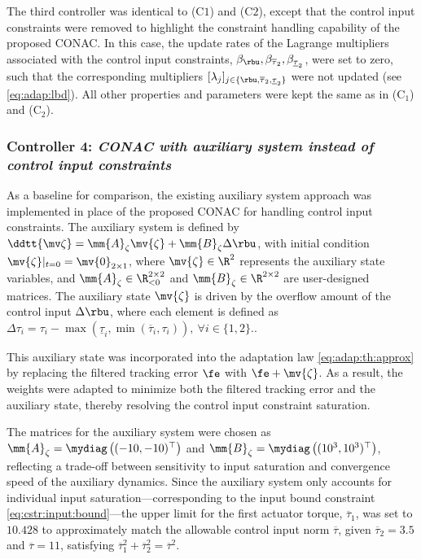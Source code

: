 \documentclass[journal]{IEEEtran}
\begin{document}
The third controller was identical to (C$1$) and (C$2$), except that the control input constraints were removed to highlight the constraint handling capability of the proposed CONAC.
In this case, the update rates of the Lagrange multipliers associated with the control input constraints, \ie $\beta_{\rbu},\beta_{\overline{\tau}_2},\beta_{\underline{\tau}_2}$, were set to zero, such that the corresponding multipliers $[\lambda_j]_{j\in\{\rbu,\overline{\tau}_2,\underline{\tau}_2\}}$ were not updated (see \eqref{eq:adap:lbd}).
All other properties and parameters were kept the same as in (C$_1$) and (C$_2$).

\subsubsection*{Controller 4:  \textit{CONAC with auxiliary system instead of control input constraints}}

As a baseline for comparison, the existing auxiliary system approach \cite{Esfandiari:2014aa, Karason:1994aa, Esfandiari:2015aa} was implemented in place of the proposed CONAC for handling control input constraints.
The auxiliary system is defined by $\ddtt{\mv\zeta} = \mm{A}_\zeta \mv{\zeta} + \mm{B}_\zeta \Delta\rbu$, with initial condition $\mv{\zeta}\vert_{t=0} = \mv{0}_{2\times1}$, where $\mv{\zeta}\in\R^2$ represents the auxiliary state variables, and $\mm{A}_\zeta\in\R_{<0}^{2\times 2}$ and $\mm{B}_\zeta\in\R^{2\times 2}$ are user-designed matrices.
The auxiliary state $\mv{\zeta}$ is driven by the overflow amount of the control input $\Delta\rbu$, where each element is defined as $\Delta\tau_{i} = \tau_{i}-\max(\underline\tau_i,\min(\overline\tau_i,\tau_i)),\ \forall i\in\{1,2\}$..

This auxiliary state was incorporated into the adaptation law \eqref{eq:adap:th:approx} by replacing the filtered tracking error $\fe$ with $\fe+\mv{\zeta}$.
As a result, the weights were adapted to minimize both the filtered tracking error and the auxiliary state, thereby resolving the control input constraint saturation.

The matrices for the auxiliary system were chosen as $\mm{A}_\zeta=\mydiag\left((-10,-10)^\top\right)$ and $\mm{B}_\zeta=\mydiag\left((10^3,10^3)^\top\right)$, reflecting a trade-off between sensitivity to input saturation and convergence speed of the auxiliary dynamics.
Since the auxiliary system only accounts for individual input saturation—corresponding to the input bound constraint \eqref{eq:cstr:input:bound}—the upper limit for the first actuator torque, $\overline{\tau}_1$, was set to $10.428$ to approximately match the allowable control input norm $\overline{\tau}$, given $\overline{\tau}_2 = 3.5$ and $\overline{\tau} = 11$, satisfying $\overline{\tau}_1^2 + \overline{\tau}_2^2 = \overline{\tau}^2$.
\end{document}
